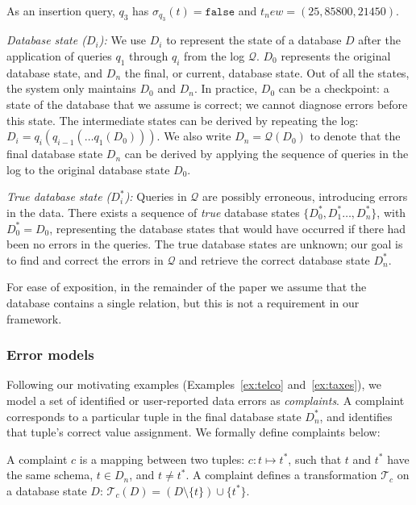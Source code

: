 As an insertion query, $q_3$ has $\sigma_{q_3}(t)=\texttt{false}$ and $t_new=(25, 85800, 21450)$.


\smallskip
\noindent
\emph{Database state ($D_i$):}
We use $D_i$ to represent the state of a database $D$ after the application of
queries $q_1$ through $q_i$ from the log $\mathcal{Q}$. $D_0$ represents the
original database state, and $D_n$ the final, or current, database state. Out
of all the states, the system only maintains $D_0$ and $D_n$. In practice,
$D_0$ can be a checkpoint: a state of the database that we assume is correct;
we cannot diagnose errors before this state. The intermediate states can be
derived by repeating the log: $D_i=q_i(q_{i-1}(\dots q_1(D_0)))$. We also
write $D_n=\mathcal{Q}(D_0)$ to denote that the final database state $D_n$ can
be derived by applying the sequence of queries in the log to the original
database state $D_0$.

\smallskip
\noindent
\emph{True database state ($D_i^*$):}
Queries in $\mathcal{Q}$ are possibly erroneous, introducing errors in the
data. There exists a sequence of \emph{true} database states $\{D_0^*,
D_1^*\dots, D_n^*\}$, with $D_0^*=D_0$, representing the database states that
would have occurred if there had been no errors in the queries.
The true database states are unknown; our goal is to find and correct the errors in $\mathcal{Q}$ and retrieve the correct database state $D_n^*$.

For ease of exposition, in the remainder of the paper we assume that the
database contains a single relation, but this is not a requirement in our
framework.


\subsubsection*{Error models}

Following our motivating examples (Examples~\ref{ex:telco}
and~\ref{ex:taxes}), we model a set of identified or user-reported
data errors as \emph{complaints}. A complaint corresponds to a
particular tuple in the final database state $D_n^*$, and identifies
that tuple's correct value assignment. We formally define complaints
below:

\begin{definition}[Complaint]
    A complaint $c$ is a mapping between two tuples: $c: t\mapsto t^*$, such that $t$ and $t^*$ have the same schema, $t\in D_n$, and $t\neq t^*$. A complaint defines a
    transformation $\mathcal{T}_c$ on a database state $D$: $\mathcal{T}_c(D)
    = (D\setminus\{t\})\cup\{t^*\}$.
\end{definition}

